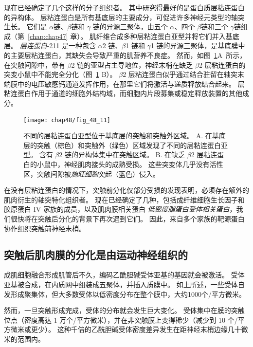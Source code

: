 现在已经确定了几个这样的分子组织者。
其中研究得最好的是蛋白质层粘连蛋白的异构体。
层粘连蛋白是所有基底层的主要成分，可促进许多神经元类型的轴突生长。
它们是 $ \alpha $链、$ \beta $链和 $ \gamma $ 链的异源三聚体，由五个 $ \alpha $、四个 $ \beta $链和三个 $ \gamma $链组成（第~\ref{chap:chap47} 章）。
肌纤维合成多种层粘连蛋白亚型并将它们并入基底层。
\textit{层连蛋白}-211 是一种包含 $ \alpha $2 链、$ \beta $1 链和 $ \gamma $1 链的异源三聚体，是基底膜中的主要层粘连蛋白，其缺失会导致严重的肌营养不良症。
然而，如图~\ref{fig:48_11}A~所示，在突触间隙中，带有 $ \beta $2 链的亚型占主导地位，神经末梢在缺乏 $ \beta $2 层粘连蛋白的突变小鼠中不能完全分化（图~\ref{fig:48_11} B）。
$ \beta $2 层粘连蛋白似乎通过结合驻留在轴突末端膜中的电压敏感钙通道发挥作用，在那里它们将激活与递质释放结合起来。
层粘连蛋白作用于通道的细胞外结构域，而细胞内片段募集或稳定释放装置的其他成分。


\begin{figure}[htbp]
	\centering
	\texttt{[image: chap48/fig\_48\_11]}
	\caption{不同的层粘连蛋白亚型位于基底层的突触和突触外区域。
		A. 在基底层的突触（棕色）和突触外（绿色）区域发现了不同的层粘连蛋白亚型。
		含有 $\beta$2 链的异构体集中在突触区域。 
		B. 在缺乏 $\beta$2 层粘连蛋白的小鼠中，神经肌肉接头的成熟受损。
		这些突变体几乎没有活性区，突触间隙被\textit{施旺细胞}突起（蓝色）侵入\cite{noakes1995aberrant}。}
	\label{fig:48_11}
\end{figure}


在没有层粘连蛋白的情况下，突触前分化仅部分受损的发现表明，必须存在额外的肌肉衍生的轴突特化组织者。
现在已经确定了几种，包括成纤维细胞生长因子和胶原蛋白 IV 家族的成员，以及肌肉膜相关蛋白 \textit{低密度脂蛋白受体相关蛋白}，我们很快将在突触后分化的背景下再次遇到它们。
因此，来自多个家族的靶源蛋白协作组织突触前神经末梢。



\subsection{突触后肌肉膜的分化是由运动神经组织的}

成肌细胞融合形成肌管后不久，编码乙酰胆碱受体亚基的基因就会被激活。
受体亚基被合成，在内质网中组装成五聚体，并插入质膜中。
如上所述，一些受体自发形成聚集体，但大多数受体以低密度分布在整个膜中，大约1000个/平方微米。


然而，一旦突触形成完成，受体的分布就会发生巨大变化。
受体集中在膜的突触位点（密度高达 1 万个/平方微米），并在非突触膜上变得稀少（减少到 10 个/平方微米或更少）。
这种千倍的乙酰胆碱受体密度差异发生在距神经末梢边缘几十微米的范围内。



